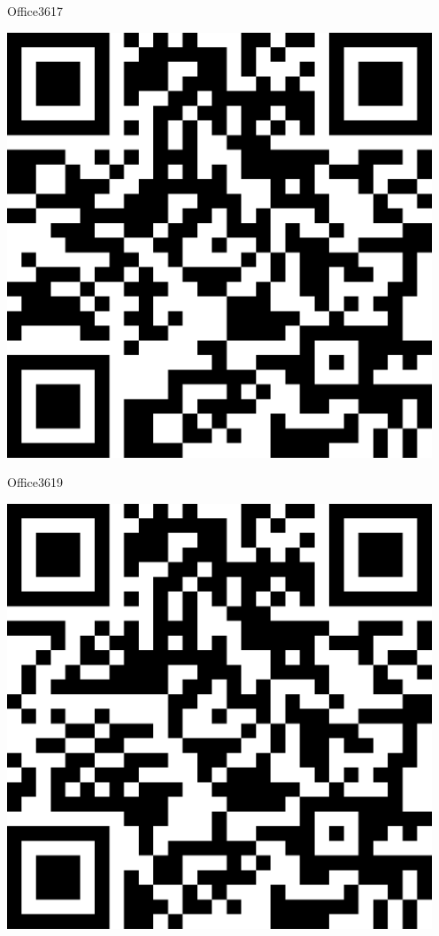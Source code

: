 \documentclass[letterpaper]{article}
\begin{document}
 \hfill{\small Office3617} 

 \vspace{1in} 
 \pagebreak 
{} 
 \vspace*{\fill} 
 \begingroup 
 \centerline{\includegraphics[scale=1,width=5in,height=5in]{Office3619.png}} 
 \endgroup 
 \vspace*{\fill} 

 \hfill{\small Office3619} 

 \vspace{1in} 
 \pagebreak 
{} 
 \vspace*{\fill} 
 \begingroup 
 \centerline{\includegraphics[scale=1,width=5in,height=5in]{Office3621.png}} 
 \endgroup 
 \vspace*{\fill} 
\end{document}
